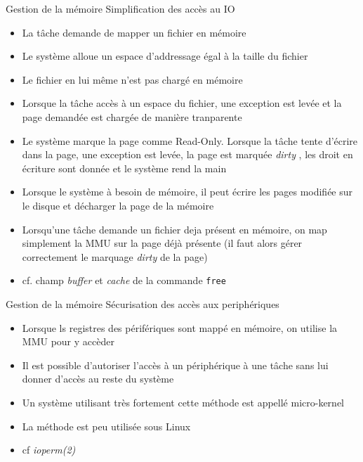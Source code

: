 \begin{frame}{ Gestion de la mémoire}
  Simplification des accès au IO
  \begin{itemize} 
  \item La tâche demande de mapper un fichier en mémoire
  \item Le système  alloue un espace d'addressage égal  à la taille du
    fichier
  \item Le fichier en lui même n'est pas chargé en mémoire
  \item Lorsque la  tâche accès à un espace  du fichier, une exception
    est levée et la page demandée est chargée de manière tranparente
  \item Le  système marque la  page comme Read-Only. Lorsque  la tâche
    tente d'écrire dans la page,  une exception est levée, la page est
    marquée \emph{dirty}  , les  droit en écriture  sont donnée  et le
    système rend la main
  \item Lorsque  le système  à besoin de  mémoire, il peut  écrire les
    pages modifiée sur le disque et décharger la page de la mémoire
  \item Lorsqu'une  tâche demande un fichier deja  présent en mémoire,
    on map simplement la MMU sur  la page déjà présente (il faut alors
    gérer correctement le marquage \emph{dirty} de la page)
  \item  cf.   champ  \emph{buffer}  et \emph{cache}  de  la  commande
    \texttt{free}
  \end{itemize}
\end{frame}

\begin{frame}{ Gestion de la mémoire}
  Sécurisation des accès aux periphériques
  \begin{itemize}
  \item Lorsque  ls registres des périfériques sont  mappé en mémoire,
    on utilise la MMU pour y accèder
  \item Il  est possible d'autoriser  l'accès à un périphérique  à une
    tâche sans lui donner d'accès au reste du système
  \item Un système utilisant  très fortement cette méthode est appellé
    micro-kernel
  \item La méthode est peu utilisée sous Linux
  \item cf \emph{ioperm(2)}
  \end{itemize}
\end{frame}

